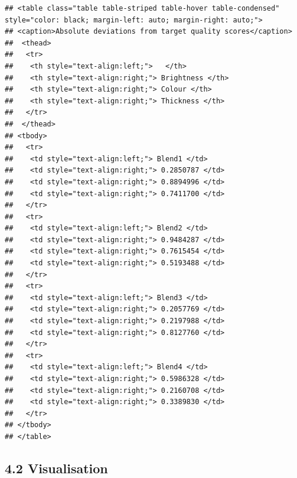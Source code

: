 \documentclass[
]{article}
\newenvironment{Shaded}{\begin{snugshade}}{\end{snugshade}}
\newcommand{\AttributeTok}[1]{\textcolor[rgb]{0.13,0.29,0.53}{#1}}
\newcommand{\CommentTok}[1]{\textcolor[rgb]{0.56,0.35,0.01}{\textit{#1}}}
\newcommand{\DecValTok}[1]{\textcolor[rgb]{0.00,0.00,0.81}{#1}}
\newcommand{\FloatTok}[1]{\textcolor[rgb]{0.00,0.00,0.81}{#1}}
\newcommand{\FunctionTok}[1]{\textcolor[rgb]{0.13,0.29,0.53}{\textbf{#1}}}
\newcommand{\NormalTok}[1]{#1}
\newcommand{\OtherTok}[1]{\textcolor[rgb]{0.56,0.35,0.01}{#1}}
\newcommand{\SpecialCharTok}[1]{\textcolor[rgb]{0.81,0.36,0.00}{\textbf{#1}}}
\newcommand{\StringTok}[1]{\textcolor[rgb]{0.31,0.60,0.02}{#1}}
\begin{document}
\begin{verbatim}
## <table class="table table-striped table-hover table-condensed" style="color: black; margin-left: auto; margin-right: auto;">
## <caption>Absolute deviations from target quality scores</caption>
##  <thead>
##   <tr>
##    <th style="text-align:left;">   </th>
##    <th style="text-align:right;"> Brightness </th>
##    <th style="text-align:right;"> Colour </th>
##    <th style="text-align:right;"> Thickness </th>
##   </tr>
##  </thead>
## <tbody>
##   <tr>
##    <td style="text-align:left;"> Blend1 </td>
##    <td style="text-align:right;"> 0.2850787 </td>
##    <td style="text-align:right;"> 0.8894996 </td>
##    <td style="text-align:right;"> 0.7411700 </td>
##   </tr>
##   <tr>
##    <td style="text-align:left;"> Blend2 </td>
##    <td style="text-align:right;"> 0.9484287 </td>
##    <td style="text-align:right;"> 0.7615454 </td>
##    <td style="text-align:right;"> 0.5193488 </td>
##   </tr>
##   <tr>
##    <td style="text-align:left;"> Blend3 </td>
##    <td style="text-align:right;"> 0.2057769 </td>
##    <td style="text-align:right;"> 0.2197988 </td>
##    <td style="text-align:right;"> 0.8127760 </td>
##   </tr>
##   <tr>
##    <td style="text-align:left;"> Blend4 </td>
##    <td style="text-align:right;"> 0.5986328 </td>
##    <td style="text-align:right;"> 0.2160708 </td>
##    <td style="text-align:right;"> 0.3389830 </td>
##   </tr>
## </tbody>
## </table>
\end{verbatim}

\subsection{4.2 Visualisation}\label{visualisation-1}

\begin{Shaded}
\end{Shaded}
\end{document}
